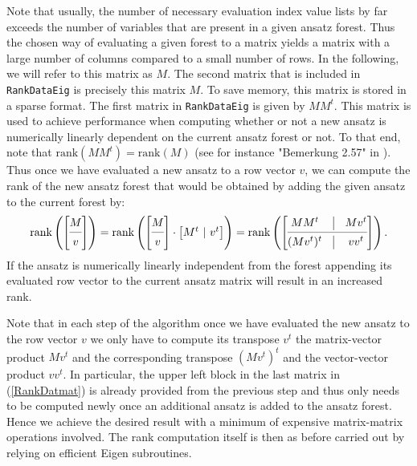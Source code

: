 Note that usually, the number of necessary evaluation index value lists by far exceeds the number of variables that are present in a given ansatz forest. Thus the chosen way of evaluating a given forest to a matrix yields a matrix with a large number of columns compared to a small number of rows. In the following, we will refer to this matrix as $M$. The second matrix that is included in \texttt{RankDataEig} is precisely this matrix $M$. To save memory, this matrix is stored in a sparse format. The first matrix in \texttt{RankDataEig} is given by $M M^t$. This matrix is used to achieve performance when computing whether or not a new ansatz is numerically linearly dependent on the current ansatz forest or not. To that end, note that $\mathrm{rank}(MM^t) = \mathrm{rank}(M)$ (see for instance "Bemerkung 2.57" in \cite{LAKnab}). Thus once we have evaluated a new ansatz to a row vector $v$, we can compute the rank of the new ansatz forest that would be obtained by adding the given ansatz to the current forest by:
\begin{align}\label{RankDatmat}
    \mathrm{rank}\left (\begin{bmatrix}
        M \\
        \cmidrule(lr){1-1} 
        v
    \end{bmatrix} \right )
    = \mathrm{rank} \left ( \begin{bmatrix}
        M \\
        \cmidrule(lr){1-1}
        v
    \end{bmatrix} \cdot \begin{bmatrix}
        M^t \ \vert \  v^t 
    \end{bmatrix} \right ) = \mathrm{rank} \left (\begin{bmatrix}
        MM^t & \vline & M v^t \\
        \cmidrule(lr){1-3}
        (Mv^t)^t & \vline & vv^t 
    \end{bmatrix}  \right ).
\end{align}
If the ansatz is numerically linearly independent from the forest appending its evaluated row vector to the current ansatz matrix will result in an increased rank.

Note that in each step of the algorithm once we have evaluated the new ansatz to the row vector $v$ we only have to compute its transpose $v^t$ the matrix-vector product $Mv^t$ and the corresponding transpose $(Mv^t)^t$ and the vector-vector product $v v^t$. In particular, the upper left block in the last matrix in (\ref{RankDatmat}) is already provided from the previous step and thus only needs to be computed newly once an additional ansatz is added to the ansatz forest. Hence we achieve the desired result with a minimum of expensive matrix-matrix operations involved. The rank computation itself is then as before carried out by relying on efficient Eigen subroutines.

